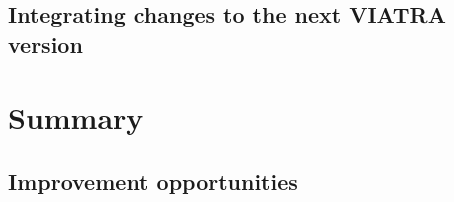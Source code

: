 \documentclass[11pt,a4paper,oneside]{report}
\begin{document}
\section{Integrating changes to the next VIATRA version}

\chapter{Summary}

\section{Improvement opportunities}


\listoffigures{}
\listoftables{}

\nocite{*} %


\label{page:last}
\end{document}
